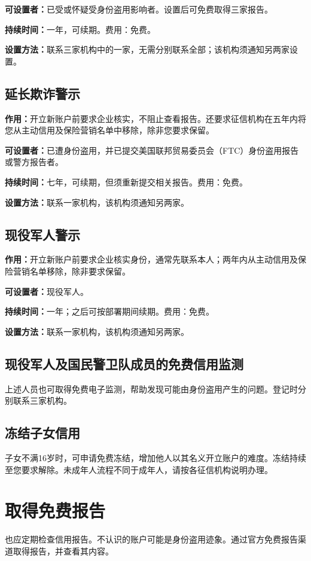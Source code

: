 \documentclass[UTF8,fontset=none,11pt,a4paper]{ctexart}
\begin{document}
\textbf{可设置者：}已受或怀疑受身份盗用影响者。设置后可免费取得\allowbreak\mbox{三家报告。}


\textbf{持续时间：}一年，可续期。费用：免费。


\textbf{设置方法：}联系三家机构中的一家，无需分别联系全部；该机构须通知另\allowbreak\mbox{两家设置。}


\subsection*{延长欺诈警示}
\textbf{作用：}开立新账户前要求企业核实，不阻止查看报告。还要求征信机构在五年内将您从主动信用及保险营销名单中移除，除非您\allowbreak\mbox{要求保留。}


\textbf{可设置者：}已遭身份盗用，并已提交美国联邦贸易委员会（FTC）身份盗用报告或警方\allowbreak\mbox{报告者。}


\textbf{持续时间：}七年，可续期，但须重新提交相关报告。费用：免费。


\textbf{设置方法：}联系一家机构，该机构须通\allowbreak\mbox{知另两家。}


\subsection*{现役军人警示}
\textbf{作用：}开立新账户前要求企业核实身份，通常先联系本人；两年内从主动信用及保险营销名单移除，除非\allowbreak\mbox{要求保留。}


\textbf{可设置者：}\allowbreak\mbox{现役军人。}


\textbf{持续时间：}一年；之后可按部署期间续期。费用：免费。


\textbf{设置方法：}联系一家机构，该机构须通\allowbreak\mbox{知另两家。}


\subsection*{现役军人及国民警卫队成员的免费信用监测}
上述人员也可取得免费电子监测，帮助发现可能由身份盗用产生的问题。登记时分别联系\allowbreak\mbox{三家机构。}


\subsection*{冻结子女信用}
子女不满16岁时，可申请免费冻结，增加他人以其名义开立账户的难度。冻结持续至您要求解除。未成年人流程不同于成年人，请按各征信机构\allowbreak\mbox{说明办理。}


\section*{取得免费报告}
也应定期检查信用报告。不认识的账户可能是身份盗用迹象。通过官方免费报告渠道取得报告，并查\allowbreak\mbox{看其内容。}
\end{document}
